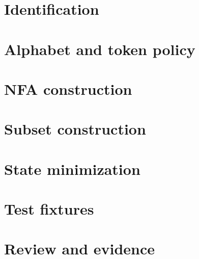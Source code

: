 \documentclass[11pt,letterpaper]{article}
\begin{document}
\makedoctitle\makedocsummary
\section{Identification}
\section{Alphabet and token policy}
\section{NFA construction}
\section{Subset construction}
\section{State minimization}
\section{Test fixtures}
\section{Review and evidence}
\end{document}
